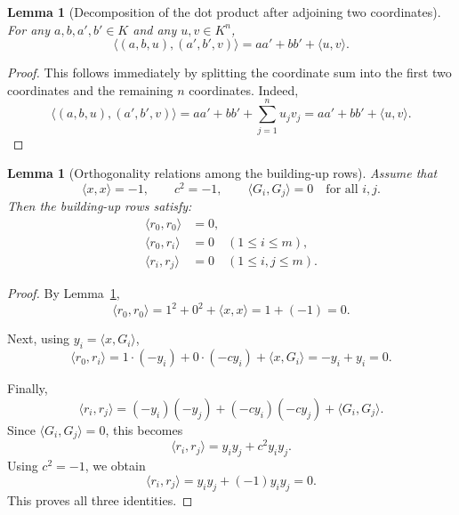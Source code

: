 \documentclass[12pt]{article}
\newtheorem{lemma}[theorem]{Lemma}
\begin{document}
\begin{lemma}[Decomposition of the dot product after adjoining two coordinates]
\label{lem:prepend-dot}
For any $a,b,a',b'\in K$ and any $u,v\in K^n$,
\[
\langle (a,b,u),(a',b',v)\rangle
=
aa' + bb' + \langle u,v\rangle.
\]
\end{lemma}

\begin{proof}
This follows immediately by splitting the coordinate sum into the first two coordinates and the remaining $n$ coordinates. Indeed,
\[
\langle (a,b,u),(a',b',v)\rangle
=
aa' + bb' + \sum_{j=1}^n u_j v_j
=
aa' + bb' + \langle u,v\rangle.
\]

\end{proof}

\begin{lemma}[Orthogonality relations among the building-up rows]
\label{lem:row-orthogonality}
Assume that
\[
\langle x,x\rangle = -1,
\qquad
c^2 = -1,
\qquad
\langle G_i,G_j\rangle = 0 \quad \text{for all } i,j.
\]
Then the building-up rows satisfy:
\begin{align*}
\langle r_0,r_0\rangle &= 0,\\
\langle r_0,r_i\rangle &= 0 \quad (1\le i\le m),\\
\langle r_i,r_j\rangle &= 0 \quad (1\le i,j\le m).
\end{align*}
\end{lemma}

\begin{proof}
By Lemma~\ref{lem:prepend-dot},
\[
\langle r_0,r_0\rangle
=
1^2 + 0^2 + \langle x,x\rangle
=
1+(-1)=0.
\]

Next, using $y_i=\langle x,G_i\rangle$,
\[
\langle r_0,r_i\rangle
=
1\cdot(-y_i)+0\cdot(-c y_i)+\langle x,G_i\rangle
=
-y_i+y_i=0.
\]

Finally,
\[
\langle r_i,r_j\rangle
=
(-y_i)(-y_j)+(-c y_i)(-c y_j)+\langle G_i,G_j\rangle.
\]
Since $\langle G_i,G_j\rangle=0$, this becomes
\[
\langle r_i,r_j\rangle
=
y_i y_j + c^2 y_i y_j.
\]
Using $c^2=-1$, we obtain
\[
\langle r_i,r_j\rangle
=
y_i y_j + (-1)y_i y_j
=
0.
\]
This proves all three identities.
\end{proof}
\end{document}
